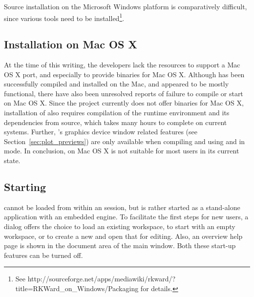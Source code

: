 Source installation on the Microsoft Windows platform is comparatively difficult, since various tools need to
be installed\footnote{
  See http://sourceforge.net/apps/mediawiki/rkward/?title=RKWard\_on\_Windows/Packaging for details.
}.

\subsection{Installation on Mac OS X}
At the time of this writing, the developers lack the resources to support a Mac OS X port, and especially
to provide binaries for Mac OS X. Although  has been successfully compiled and installed on the Mac, and
appeared to be mostly functional, there have also been unresolved reports of failure to compile or start
 on Mac OS X. Since the  project currently does not offer binaries for Mac OS X,
installation of  also requires compilation of the  runtime environment and its
dependencies from source, which takes many hours to complete on current systems. Further, 's
graphics device window related features (see Section~\ref{sec:plot_previews}) are only available when
compiling and using  and  in  mode. In conclusion,  on Mac OS X is
not suitable for most users in its current state.

\subsection[Starting RKWard]{Starting }
 cannot be loaded from within an 
session, but is rather started as a stand-alone application with an
embedded  engine. To facilitate the first
steps for new users, a dialog offers the choice to load an existing
workspace, to start with an empty workspace, or to create a new
 and open that for editing. Also, an overview help page is
shown in the document area of the main window. Both these start-up features
can be turned off.
